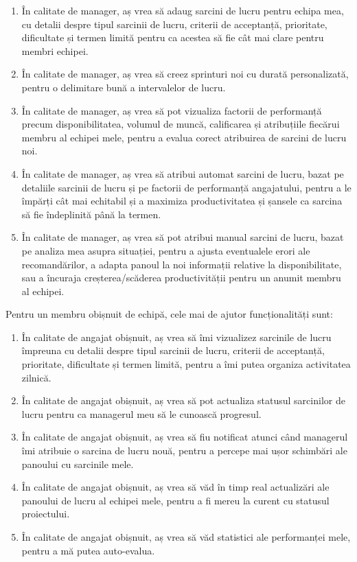\begin{enumerate}
 	 \item În calitate de manager, aș vrea să adaug sarcini de lucru pentru echipa mea, cu detalii despre tipul sarcinii de lucru, criterii de acceptanță, prioritate, dificultate și termen limită pentru ca acestea să fie cât mai clare pentru membri echipei.

 	 \item În calitate de manager, aș vrea să creez sprinturi noi cu durată personalizată, pentru o delimitare bună a intervalelor de lucru.

 	 \item În calitate de manager, aș vrea să pot vizualiza factorii de performanță precum disponibilitatea, volumul de muncă, calificarea și atribuțiile fiecărui membru al echipei mele, pentru a evalua corect atribuirea de sarcini de lucru noi.

 	 \item În calitate de manager, aș vrea să atribui automat sarcini de lucru, bazat pe detaliile sarcinii de lucru și pe factorii de performanță angajatului, pentru a le împărți cât mai echitabil și a maximiza productivitatea și șansele ca sarcina să fie îndeplinită până la
termen.

 	 \item În calitate de manager, aș vrea să pot atribui manual sarcini de lucru, bazat pe analiza mea asupra situației, pentru a ajusta eventualele erori ale recomandărilor, a adapta panoul la noi informații relative la disponibilitate, sau a încuraja creșterea/scăderea productivității pentru un anumit membru al echipei.
\end{enumerate}

Pentru un membru obișnuit de echipă, cele mai de ajutor funcționalități sunt:
\begin{enumerate}
 	 \item În calitate de angajat obișnuit, aș vrea să îmi vizualizez sarcinile de lucru împreuna cu detalii despre tipul sarcinii de lucru, criterii de acceptanță, prioritate, dificultate și termen limită, pentru a îmi putea organiza activitatea zilnică.

 	 \item În calitate de angajat obișnuit, aș vrea să pot actualiza statusul sarcinilor de lucru pentru ca managerul meu să le cunoască progresul.

 	 \item În calitate de angajat obișnuit, aș vrea să fiu notificat atunci când managerul îmi atribuie o sarcina de lucru nouă, pentru a percepe mai ușor schimbări ale panoului cu sarcinile mele.

 	 \item În calitate de angajat obișnuit, aș vrea să văd în timp real actualizări ale panoului de lucru al echipei mele, pentru a fi mereu la curent cu statusul proiectului.

 	\item În calitate de angajat obișnuit, aș vrea să văd statistici ale performanței mele, pentru a mă putea auto-evalua.
\end{enumerate}

